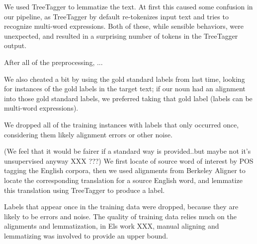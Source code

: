 \documentclass[11pt,letterpaper]{article}
\begin{document}
We used TreeTagger \cite{Schmid95improvementsin} to lemmatize the text. At
first this caused some confusion in our pipeline, as TreeTagger by default
re-tokenizes input text and tries to recognize multi-word expressions. Both of
these, while sensible behaviors, were unexpected, and resulted in a surprising 
number of tokens in the TreeTagger output.

After all of the preprocessing,  ...

We also cheated a bit by using the gold standard labels from last time, looking
for instances of the gold labels in the target text; if our noun had an
alignment into those gold standard labels, we preferred taking that gold label
(labels can be multi-word expressions).

We dropped all of the training instances with labels that only occurred once,
considering them likely alignment errors or other noise.

(We feel that it would be fairer if a standard way is provided..but maybe not
it's unsupervised anyway XXX ???) We first locate of source word of interest by
POS tagging the English corpora, then we used alignments from Berkeley Aligner
to locate the corresponding translation for a source English word, and
lemmatize this translation using TreeTagger to produce a label.

Labels that appear once in the training data were dropped, because they are likely to be errors and noise.
The quality of training data relies much on the alignments and lemmatization, in Els work XXX, manual aligning and lemmatizing was involved to provide an upper bound.
\end{document}
